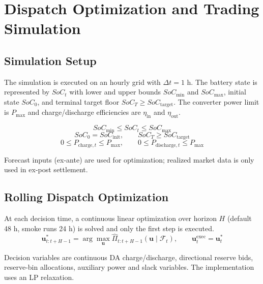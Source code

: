\section{Dispatch Optimization and Trading Simulation}\label{ch:methodology:dispatch-optimization-and-trading-simulation}
\subsection{Simulation Setup}
The simulation is executed on an hourly grid with $\Delta t = 1$ h. The battery state is represented by $SoC_t$ with lower and upper bounds $SoC_{\min}$ and $SoC_{\max}$, initial state $SoC_0$, and terminal target floor $SoC_T \ge SoC_{\text{target}}$. The converter power limit is $P_{\max}$ and charge/discharge efficiencies are $\eta_{\text{in}}$ and $\eta_{\text{out}}$.

\begin{equation}\label{eq:setup-soc-bounds}
    SoC_{\min} \le SoC_t \le SoC_{\max}
\end{equation}
\begin{equation}\label{eq:setup-soc-initial-terminal}
    SoC_0 = SoC_{\text{init}},
    \qquad
    SoC_T \ge SoC_{\text{target}}
\end{equation}
\begin{equation}\label{eq:setup-power-bounds}
    0 \le P_{\text{charge},t} \le P_{\max},
    \qquad
    0 \le P_{\text{discharge},t} \le P_{\max}
\end{equation}

Forecast inputs (ex-ante) are used for optimization; realized market data is only used in ex-post settlement.

\subsection{Rolling Dispatch Optimization}
At each decision time, a continuous linear optimization over horizon $H$ (default 48 h, smoke runs 24 h) is solved and only the first step is executed.
\begin{equation}\label{eq:rolling-dispatch-policy}
    \mathbf{u}^{*}_{t:t+H-1}
    =
    \arg\max_{\mathbf{u}} \hat{\Pi}_{t:t+H-1}(\mathbf{u}\mid\mathcal{F}_t),
    \qquad
    \mathbf{u}^{\mathrm{exec}}_{t}=\mathbf{u}^{*}_{t}
\end{equation}

Decision variables are continuous DA charge/discharge, directional reserve bids, reserve-bin allocations, auxiliary power and slack variables. The implementation uses an LP relaxation.

